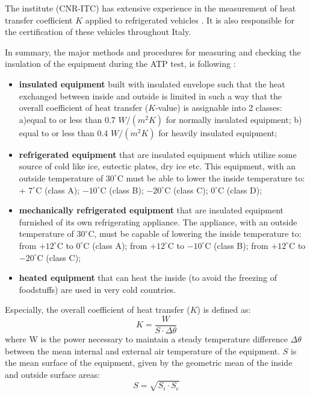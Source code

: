 The institute (CNR-ITC) has extensive experience in the measurement of heat transfer coefficient $K$ applied to refrigerated vehicles \citep{rossi2009k,bison1993automatic,bison2012geometrical,dragano2009experimental,grinzato2010r}. It is also responsible for the certification of these vehicles throughout Italy.

In summary, the major methods and procedures for measuring and checking the insulation of the equipment during the ATP test, is following \citep{rossi2009k}: 
\begin{itemize}
	\item \textbf{insulated equipment} built with insulated envelope such that the heat exchanged between inside and outside is limited in such a way that the overall coefficient of heat transfer ($K$-value) is assignable into 2 classes: a)equal to or less than 0.7 $W/(m^2 K)$ for normally insulated equipment; b) equal to or less than 0.4 $W/(m^2 K)$ for heavily insulated equipment; 
	
	\item\textbf{refrigerated equipment} that are insulated equipment which utilize some source of cold like ice, eutectic plates, dry ice etc. This equipment, with an outside temperature of $30^{\circ}$C must be able to lower the inside temperature to: + $7^{\circ}$C (class A); $-10^{\circ}$C (class B); $-20^{\circ}$C (class C); $0^{\circ}$C (class D); 
	
	\item \textbf{mechanically refrigerated equipment} that  are  insulated  equipment  furnished  of  its  own  refrigerating appliance.  The  appliance,  with  an  outside  temperature  of  $30^{\circ}$C,  must  be  capable  of  lowering  the  inside temperature to: from $+12^{\circ}$C to $0^{\circ}$C (class A); from $+ 12^{\circ}$C to $-10^{\circ}$C (class B); from $+ 12^{\circ}$C to $- 20^{\circ}$C (class C); 
	
	\item \textbf{heated  equipment} that  can  heat  the  inside  (to  avoid  the  freezing  of  foodstuffs)  are  used  in  very  cold countries.
\end{itemize}
Especially, the overall coefficient of heat transfer ($K$) is defined as:
\begin{equation}
K = \frac{W}{S\cdot \Delta \theta}
\end{equation}
where W is  the  power  necessary  to  maintain  a  steady  temperature  difference $\Delta \theta$ between  the  mean internal and external air temperature of the equipment. $S$ is the mean surface of the equipment, given by the geometric mean of the inside and outside surface areas:
\begin{equation}
S = \sqrt{S_i \cdot S_e}
\end{equation}

